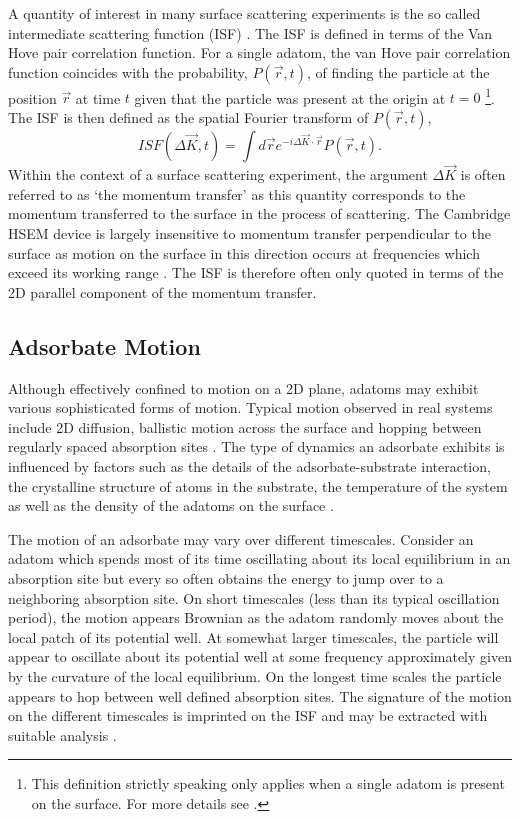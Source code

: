 A quantity of interest in many surface scattering experiments is the so called intermediate scattering function (ISF) \cite{HSEM, JARDINE2009323, Ward}. The ISF is defined in terms of the Van Hove pair correlation function. For a single adatom, the van Hove pair correlation function coincides with the probability, $P(\vec{r}, t)$, of finding the particle at the position $\vec{r}$ at time $t$ given that the particle was present at the origin at $t=0$ \cite{vanhove} \footnote{This definition strictly speaking only applies when a single adatom is present on the surface. For more details see \cite{vanhove}.}. The ISF is then defined as the spatial Fourier transform of $P\left(\vec{r}, t\right)$,
\begin{equation}
	ISF\left(\Delta{\vec{K}}, t\right) = \int d\vec{r} e^{-i\Delta{\vec{K}}\cdot\vec{r}} P\left(\vec{r}, t\right).
\end{equation}
Within the context of a surface scattering experiment, the argument $\Delta{\vec{K}}$ is often referred to as `the momentum transfer' as this quantity corresponds to the momentum transferred to the surface in the process of scattering. The Cambridge HSEM device is largely insensitive to momentum transfer perpendicular to the surface as motion on the surface in this direction occurs at frequencies which exceed its working range \cite{HSEM}. The ISF is therefore often only quoted in terms of the 2D parallel component of the momentum transfer. 

\subsection{Adsorbate Motion}

Although effectively confined to motion on a 2D plane, adatoms may exhibit various sophisticated forms of motion. Typical motion observed in real systems include 2D diffusion, ballistic motion across the surface and hopping between regularly spaced absorption sites \cite{Ward, Townsend}. The type of dynamics an adsorbate exhibits is influenced by factors such as the details of the adsorbate-substrate interaction, the crystalline structure of atoms in the substrate, the temperature of the system as well as the density of the adatoms on the surface \cite{Ward, Townsend}. 

The motion of an adsorbate may vary over different timescales. Consider an adatom which spends most of its time oscillating about its local equilibrium in an absorption site but every so often obtains the energy to jump over to a neighboring absorption site. On short timescales (less than its typical oscillation period), the motion appears Brownian as the adatom randomly moves about the local patch of its potential well. At somewhat larger timescales, the particle will appear to oscillate about its potential well at some frequency approximately given by the curvature of the local equilibrium. On the longest time scales the particle appears to hop between well defined absorption sites. The signature of the motion on the different timescales is imprinted on the ISF and may be extracted with suitable analysis \cite{Ward}.


